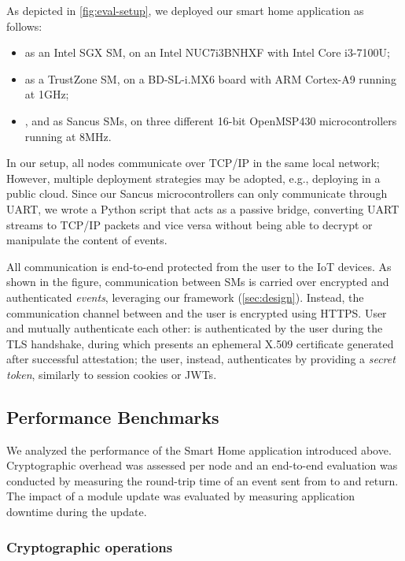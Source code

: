 As depicted in \cref{fig:eval-setup}, we deployed our smart home application as
follows:
%
\begin{itemize}
  \item \web{} as an Intel \ac{SGX} \ac{SM}, on an Intel NUC7i3BNHXF with Intel
  Core i3-7100U;
  \item \gateway{} as a TrustZone \ac{SM}, on a BD-SL-i.MX6 board with ARM
  Cortex-A9 running at 1GHz;
  \item \tempsensor, \thermostat{} and \light{} as Sancus \acp{SM}, on three
  different 16-bit OpenMSP430 microcontrollers running at 8MHz.
\end{itemize}
%
In our setup, all nodes communicate over TCP/IP in the same local network;
However, multiple deployment strategies may be adopted, e.g., deploying \web{}
in a public cloud. Since our Sancus microcontrollers can only communicate
through UART, we wrote a Python script that acts as a passive bridge, converting
UART streams to TCP/IP packets and vice versa without being able to decrypt or
manipulate the content of events. 

All communication is end-to-end protected from the user to the IoT devices. As
shown in the figure, communication between \acp{SM} is carried over encrypted
and authenticated \emph{events}, leveraging our framework (\cref{sec:design}).
Instead, the communication channel between \web{} and the user is encrypted
using HTTPS. User and \web{} mutually authenticate each other: \web{} is
authenticated by the user during the TLS handshake, during which \web{} presents
an ephemeral X.509 certificate generated after successful attestation; the user,
instead, authenticates by providing a \emph{secret token}, similarly to session
cookies or \acp{JWT}.

\subsection{Performance Benchmarks}
\label{eval:microb}

We analyzed the performance of the Smart Home application introduced above.
Cryptographic overhead was assessed per node and an end-to-end evaluation was
conducted by measuring the round-trip time of an event sent from \web{} to
\light{} and return. The impact of a module update was evaluated by measuring
application downtime during the update.

\subsubsection{Cryptographic operations}
\label{eval:microb-crypto}

